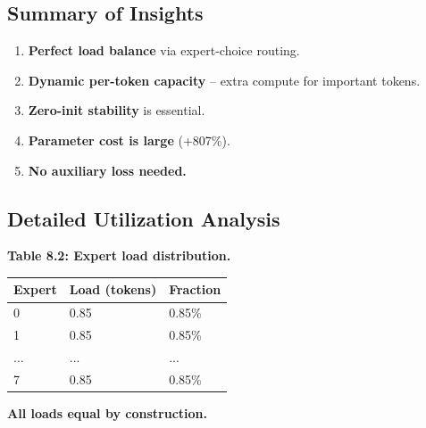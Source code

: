 \subsection{Summary of Insights}

\begin{enumerate}
\item \textbf{Perfect load balance} via expert-choice routing.
\item \textbf{Dynamic per-token capacity} -- extra compute for important tokens.
\item \textbf{Zero-init stability} is essential.
\item \textbf{Parameter cost is large} (+807\%).
\item \textbf{No auxiliary loss needed.}

\end{enumerate}
\subsection{Detailed Utilization Analysis}

\textbf{Table 8.2: Expert load distribution.}

\begin{table}[H]
\centering
\small
\begin{tabular}{lll}
\toprule
\textbf{Expert} & \textbf{Load (tokens)} & \textbf{Fraction} \\
\midrule
0 & 0.85 & 0.85\% \\
1 & 0.85 & 0.85\% \\
... & ... & ... \\
7 & 0.85 & 0.85\% \\
\bottomrule
\end{tabular}
\end{table}

\textbf{All loads equal by construction.}

